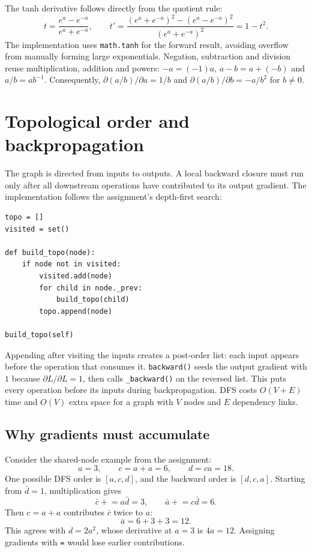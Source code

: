 \documentclass[11pt,a4paper]{article}
\newcommand{\code}[1]{\texttt{#1}}
\begin{document}
The tanh derivative follows directly from the quotient rule:
\[
t=\frac{e^a-e^{-a}}{e^a+e^{-a}},\qquad
t'=\frac{(e^a+e^{-a})^2-(e^a-e^{-a})^2}
{(e^a+e^{-a})^2}=1-t^2.
\]
The implementation uses \code{math.tanh} for the forward result, avoiding
overflow from manually forming large exponentials. Negation, subtraction
and division reuse multiplication, addition and powers:
$-a=(-1)a$, $a-b=a+(-b)$ and $a/b=ab^{-1}$.
Consequently, $\partial(a/b)/\partial a=1/b$ and
$\partial(a/b)/\partial b=-a/b^2$ for $b\ne0$.

\newpage
\section{Topological order and backpropagation}
The graph is directed from inputs to outputs. A local backward closure must
run only after all downstream operations have contributed to its output
gradient. The implementation follows the assignment's depth-first search:
\begin{verbatim}
topo = []
visited = set()

def build_topo(node):
    if node not in visited:
        visited.add(node)
        for child in node._prev:
            build_topo(child)
        topo.append(node)

build_topo(self)
\end{verbatim}
Appending after visiting the inputs creates a post-order list: each input
appears before the operation that consumes it. \code{backward()} seeds the
output gradient with $1$ because $\partial L/\partial L=1$, then calls
\code{\_backward()} on the reversed list. This puts every operation before
its inputs during backpropagation. DFS costs $O(V+E)$ time and $O(V)$ extra
space for a graph with $V$ nodes and $E$ dependency links.

\subsection{Why gradients must accumulate}
Consider the shared-node example from the assignment:
\[
a=3,\qquad c=a+a=6,\qquad d=ca=18.
\]
One possible DFS order is $[a,c,d]$, and the backward order is $[d,c,a]$.
Starting from $\bar d=1$, multiplication gives
\[
\bar c\mathrel{+}=a\bar d=3,\qquad
\bar a\mathrel{+}=c\bar d=6.
\]
Then $c=a+a$ contributes $\bar c$ twice to $a$:
\[
\bar a=6+3+3=12.
\]
This agrees with $d=2a^2$, whose derivative at $a=3$ is $4a=12$.
Assigning gradients with \code{=} would lose earlier contributions.
\end{document}
